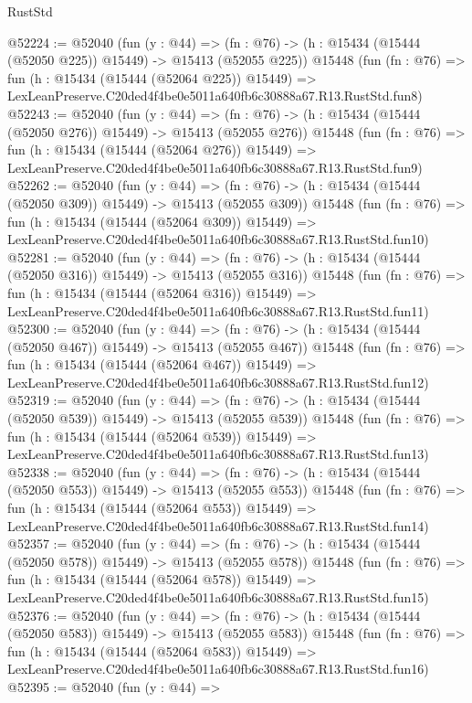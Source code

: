 \begin{lexlean}{RustStd}
\begin{coremodule}
@52224 := @52040
    (fun (y : @44) =>
    (fn : @76) -> (h : @15434 (@15444 (@52050 @225)) @15449) -> @15413 (@52055 @225))
    @15448
    (fun (fn : @76) =>
    fun (h : @15434 (@15444 (@52064 @225)) @15449) =>
    LexLeanPreserve.C20ded4f4be0e5011a640fb6c30888a67.R13.RustStd.fun8)
@52243 := @52040
    (fun (y : @44) =>
    (fn : @76) -> (h : @15434 (@15444 (@52050 @276)) @15449) -> @15413 (@52055 @276))
    @15448
    (fun (fn : @76) =>
    fun (h : @15434 (@15444 (@52064 @276)) @15449) =>
    LexLeanPreserve.C20ded4f4be0e5011a640fb6c30888a67.R13.RustStd.fun9)
@52262 := @52040
    (fun (y : @44) =>
    (fn : @76) -> (h : @15434 (@15444 (@52050 @309)) @15449) -> @15413 (@52055 @309))
    @15448
    (fun (fn : @76) =>
    fun (h : @15434 (@15444 (@52064 @309)) @15449) =>
    LexLeanPreserve.C20ded4f4be0e5011a640fb6c30888a67.R13.RustStd.fun10)
@52281 := @52040
    (fun (y : @44) =>
    (fn : @76) -> (h : @15434 (@15444 (@52050 @316)) @15449) -> @15413 (@52055 @316))
    @15448
    (fun (fn : @76) =>
    fun (h : @15434 (@15444 (@52064 @316)) @15449) =>
    LexLeanPreserve.C20ded4f4be0e5011a640fb6c30888a67.R13.RustStd.fun11)
@52300 := @52040
    (fun (y : @44) =>
    (fn : @76) -> (h : @15434 (@15444 (@52050 @467)) @15449) -> @15413 (@52055 @467))
    @15448
    (fun (fn : @76) =>
    fun (h : @15434 (@15444 (@52064 @467)) @15449) =>
    LexLeanPreserve.C20ded4f4be0e5011a640fb6c30888a67.R13.RustStd.fun12)
@52319 := @52040
    (fun (y : @44) =>
    (fn : @76) -> (h : @15434 (@15444 (@52050 @539)) @15449) -> @15413 (@52055 @539))
    @15448
    (fun (fn : @76) =>
    fun (h : @15434 (@15444 (@52064 @539)) @15449) =>
    LexLeanPreserve.C20ded4f4be0e5011a640fb6c30888a67.R13.RustStd.fun13)
@52338 := @52040
    (fun (y : @44) =>
    (fn : @76) -> (h : @15434 (@15444 (@52050 @553)) @15449) -> @15413 (@52055 @553))
    @15448
    (fun (fn : @76) =>
    fun (h : @15434 (@15444 (@52064 @553)) @15449) =>
    LexLeanPreserve.C20ded4f4be0e5011a640fb6c30888a67.R13.RustStd.fun14)
@52357 := @52040
    (fun (y : @44) =>
    (fn : @76) -> (h : @15434 (@15444 (@52050 @578)) @15449) -> @15413 (@52055 @578))
    @15448
    (fun (fn : @76) =>
    fun (h : @15434 (@15444 (@52064 @578)) @15449) =>
    LexLeanPreserve.C20ded4f4be0e5011a640fb6c30888a67.R13.RustStd.fun15)
@52376 := @52040
    (fun (y : @44) =>
    (fn : @76) -> (h : @15434 (@15444 (@52050 @583)) @15449) -> @15413 (@52055 @583))
    @15448
    (fun (fn : @76) =>
    fun (h : @15434 (@15444 (@52064 @583)) @15449) =>
    LexLeanPreserve.C20ded4f4be0e5011a640fb6c30888a67.R13.RustStd.fun16)
@52395 := @52040
    (fun (y : @44) =>

\end{coremodule}
\end{lexlean}
